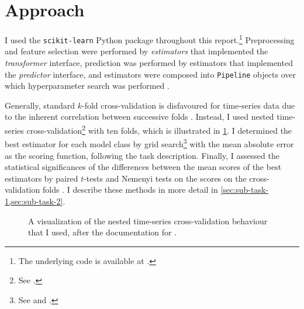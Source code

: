 \section{Approach}
\label{sec:approach}

I used the \texttt{scikit-learn} Python package \parencite{Pedregosa2011} throughout
this report.\footnote{The underlying code is available at
	.} Preprocessing and
feature selection were performed by \emph{estimators} that implemented the
\emph{transformer} interface, prediction was performed by estimators that implemented
the \emph{predictor} interface, and estimators were composed into \texttt{Pipeline}
objects over which hyperparameter search was performed \parencite[4-9]{Buitinck2013}.

Generally, standard $k$-fold cross-validation is disfavoured for time-series data due
to the inherent correlation between successive folds \parencite{Bergmeir2018}.
Instead, I used nested time-series cross-validation\footnote{See
	.} with ten folds, which is illustrated in
\cref{fig-cv}.
I determined the best estimator for each model class by grid search\footnote{See
	 and
	.
} with the mean absolute error as the scoring function, following the task description.
Finally, I assessed the statistical significances of the differences between the mean
scores of the best estimators by paired $t$-tests and Nemenyi tests on the scores on
the cross-validation folds \parencite[353-354]{Flach2012}.
I describe these methods in more detail in \cref{sec:sub-task-1,sec:sub-task-2}.

\begin{figure}
	
	\caption{
		A visualization of the nested time-series cross-validation behaviour that I used,
		after the documentation for .
	}
	\label{fig-cv}
\end{figure}
